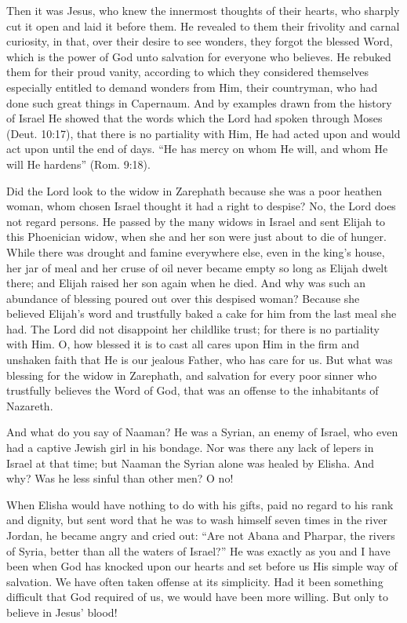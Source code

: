 Then it was Jesus, who knew the innermost thoughts of their hearts, who sharply cut it open and laid it before them. He revealed to them their frivolity and carnal curiosity, in that, over their desire to see wonders, they forgot the blessed Word, which is the power of God unto salvation for everyone who believes. He rebuked them for their proud vanity, according to which they considered themselves especially entitled to demand wonders from Him, their countryman, who had done such great things in Capernaum. And by examples drawn from the history of Israel He showed that the words which the Lord had spoken through Moses (Deut. 10:17), that there is no partiality with Him, He had acted upon and would act upon until the end of days. “He has mercy on whom He will, and whom He will He hardens” (Rom. 9:18).

Did the Lord look to the widow in Zarephath because she was a poor heathen woman, whom chosen Israel thought it had a right to despise? No, the Lord does not regard persons. He passed by the many widows in Israel and sent Elijah to this Phoenician widow, when she and her son were just about to die of hunger. While there was drought and famine everywhere else, even in the king’s house, her jar of meal and her cruse of oil never became empty so long as Elijah dwelt there; and Elijah raised her son again when he died. And why was such an abundance of blessing poured out over this despised woman? Because she believed Elijah’s word and trustfully baked a cake for him from the last meal she had. The Lord did not disappoint her childlike trust; for there is no partiality with Him. O, how blessed it is to cast all cares upon Him in the firm and unshaken faith that He is our jealous Father, who has care for us. But what was blessing for the widow in Zarephath, and salvation for every poor sinner who trustfully believes the Word of God, that was an offense to the inhabitants of Nazareth.

And what do you say of Naaman? He was a Syrian, an enemy of Israel, who even had a captive Jewish girl in his bondage. Nor was there any lack of lepers in Israel at that time; but Naaman the Syrian alone was healed by Elisha. And why? Was he less sinful than other men? O no!

When Elisha would have nothing to do with his gifts, paid no regard to his rank and dignity, but sent word that he was to wash himself seven times in the river Jordan, he became angry and cried out: “Are not Abana and Pharpar, the rivers of Syria, better than all the waters of Israel?” He was exactly as you and I have been when God has knocked upon our hearts and set before us His simple way of salvation. We have often taken offense at its simplicity. Had it been something difficult that God required of us, we would have been more willing. But only to believe in Jesus’ blood!


